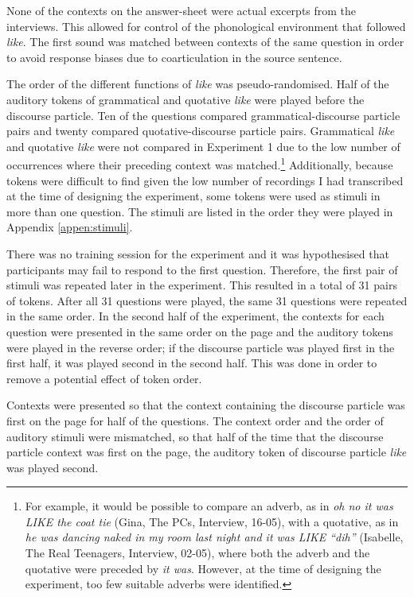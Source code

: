 None of the contexts on the answer-sheet were actual excerpts from the interviews. This allowed for control of the phonological environment that followed \textit{like}. The first sound was matched between contexts of the same question in order to avoid response biases due to coarticulation in the source sentence.

The order of the different functions of \textit{like} was pseudo-randomised. Half of the auditory tokens of grammatical and quotative \textit{like} were played before the discourse particle. Ten of the questions compared grammatical-discourse particle pairs and twenty compared quotative-discourse particle pairs. Grammatical \textit{like} and quotative \textit{like} were not compared in Experiment 1 due to the low number of occurrences where their preceding context was matched.\footnote{For example, it would be possible to compare an adverb, as in \textit{oh no it was LIKE the coat tie} (Gina, The PCs, Interview, 16-05), with a quotative, as in \textit{he was dancing naked in my room last night and it was LIKE ``dih''} (Isabelle, The Real Teenagers, Interview, 02-05), where both the adverb and the quotative were preceded by \textit{it was}. However, at the time of designing the experiment, too few suitable adverbs were identified.} Additionally, because tokens were difficult to find given the low number of recordings I had transcribed at the time of designing the experiment, some tokens were used as stimuli in more than one question. The stimuli are listed in the order they were played in Appendix \ref{appen:stimuli}.

There was no training session for the experiment and it was hypothesised that participants may fail to respond to the first question. Therefore, the first pair of stimuli was repeated later in the experiment.  This resulted in a total of 31 pairs of tokens. After all 31 questions were played, the same 31 questions were repeated in the same order. In the second half of the experiment, the contexts for each question were presented in the same order on the page and the auditory tokens were played in the reverse order; if the discourse particle was played first in the first half, it was played second in the second half. This was done in order to remove a potential effect of token order.

Contexts were presented so that the context containing the discourse particle was first on the page for half of the questions. The context order and the order of auditory stimuli were mismatched, so that half of the time that the discourse particle context was first on the page, the auditory token of discourse particle \textit{like} was played second. 

